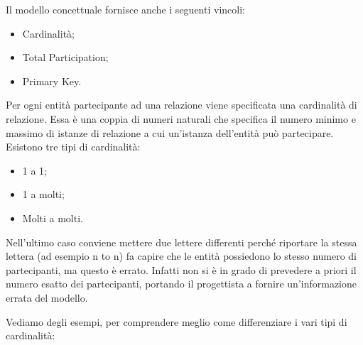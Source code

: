 Il modello concettuale fornisce anche i seguenti vincoli:

\begin{itemize}

\item Cardinalità;
\item Total Participation;
\item Primary Key.

\end{itemize}

Per ogni entità partecipante ad una relazione viene specificata una cardinalità di relazione. Essa è una coppia di numeri naturali che specifica il numero minimo e massimo di istanze di relazione a cui un’istanza dell'entità può partecipare. Esistono tre tipi di cardinalità: 

\begin{itemize}

\item 1 a 1;
\item 1 a molti;
\item Molti a molti.

\end{itemize}

Nell’ultimo caso conviene mettere due lettere differenti perché riportare la stessa lettera (ad esempio n to n) fa capire che le entità possiedono lo stesso numero di partecipanti, ma questo è errato. Infatti non si è in 
grado di prevedere a priori il numero esatto dei partecipanti, portando il progettista a fornire un’informazione errata del modello. 

Vediamo degli esempi, per comprendere meglio come differenziare i vari tipi di cardinalità: 

